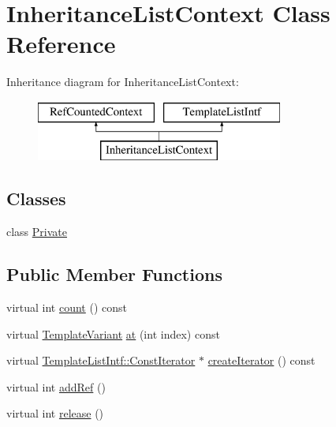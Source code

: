 \hypertarget{class_inheritance_list_context}{}\section{Inheritance\+List\+Context Class Reference}
\label{class_inheritance_list_context}
Inheritance diagram for Inheritance\+List\+Context\+:\begin{figure}[H]
\begin{center}
\leavevmode
\includegraphics[height=2.000000cm]{class_inheritance_list_context}
\end{center}
\end{figure}
\subsection*{Classes}
\begin{DoxyCompactItemize}
\item 
class \mbox{\hyperlink{class_inheritance_list_context_1_1_private}{Private}}
\end{DoxyCompactItemize}
\subsection*{Public Member Functions}
\begin{DoxyCompactItemize}
\item 
virtual int \mbox{\hyperlink{class_inheritance_list_context_aa7fe14f7d71b1d955c22b26cb320f77b}{count}} () const
\item 
virtual \mbox{\hyperlink{class_template_variant}{Template\+Variant}} \mbox{\hyperlink{class_inheritance_list_context_a789d4875a82da88a35263a80c1043890}{at}} (int index) const
\item 
virtual \mbox{\hyperlink{class_template_list_intf_1_1_const_iterator}{Template\+List\+Intf\+::\+Const\+Iterator}} $\ast$ \mbox{\hyperlink{class_inheritance_list_context_aaeb8bab49572f9c9d390a4e197764c90}{create\+Iterator}} () const
\item 
virtual int \mbox{\hyperlink{class_inheritance_list_context_aedfb5cadd50ed52c6f1632cbcdbfa85d}{add\+Ref}} ()
\item 
virtual int \mbox{\hyperlink{class_inheritance_list_context_a1ab111b2d69cdf8920529f5674dba6d9}{release}} ()
\end{DoxyCompactItemize}
